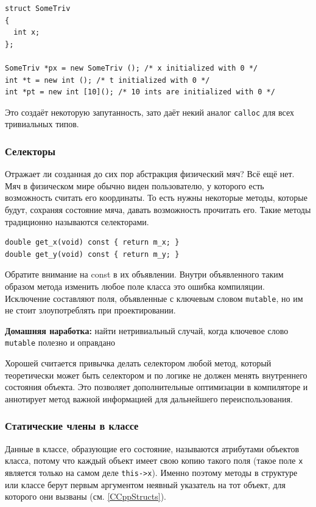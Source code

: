 \documentclass[a4paper,12pt,oneside]{article}
\begin{document}
\begin{lstlisting}
struct SomeTriv
{
  int x;
};

SomeTriv *px = new SomeTriv (); /* x initialized with 0 */
int *t = new int (); /* t initialized with 0 */
int *pt = new int [10](); /* 10 ints are initialized with 0 */
\end{lstlisting}

Это создаёт некоторую запутанность, зато даёт некий аналог \lstinline!calloc! для всех тривиальных типов. 

\subsubsection{Селекторы}\label{Selectors}

Отражает ли созданная до сих пор абстракция физический мяч? Всё ещё нет. Мяч в физическом мире обычно виден пользователю, у которого есть возможность считать его координаты. То есть нужны некоторые методы, которые будут, сохраняя состояние мяча, давать возможность прочитать его. Такие методы традиционно называются селекторами.

\begin{lstlisting}
double get_x(void) const { return m_x; }
double get_y(void) const { return m_y; }
\end{lstlisting}

Обратите внимание на const в их объявлении. Внутри объявленного таким образом метода изменить любое поле класса это ошибка компиляции. Исключение составляют поля, объявленные с ключевым словом \lstinline!mutable!, но им не стоит злоупотреблять при проектировании.

\textbf{Домашняя наработка:} найти нетривиальный случай, когда ключевое слово \lstinline!mutable! полезно и оправдано

Хорошей считается привычка делать селектором любой метод, который теоретически может быть селектором и по логике не должен менять внутреннего состояния объекта. Это позволяет дополнительные оптимизации в компиляторе и аннотирует  метод важной информацией для дальнейшего переиспользования.

\subsubsection{Статические члены в классе}\label{StaticMembers}

Данные в классе, образующие его состояние, называются атрибутами объектов класса, потому что каждый объект имеет свою копию такого поля (такое поле \lstinline!x! является только на самом деле \lstinline!this->x!). Именно поэтому методы в структуре или классе берут первым аргументом неявный указатель на тот объект, для которого они вызваны (см. \ref{CCppStructs}).
\end{document}
